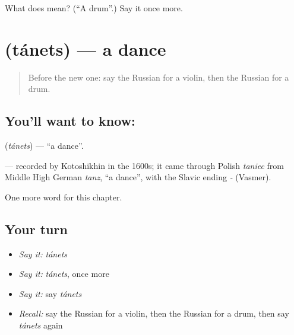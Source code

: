 \begin{tcolorbox}[breakable,colback=teal!4,colframe=teal!35!black,title={Before you move on}]
What does  mean? (\textquotedblleft{}A drum\textquotedblright{}.) Say it once more.
\end{tcolorbox}
\section[\texorpdfstring{\ru{танец} (tánets)}{танец (tánets)}]{ (tánets) — a dance}

\label{lesson:RU-C226-tanets}



\begin{quote}
Before the new one: say the Russian for a violin, then the Russian for a drum.
\end{quote}

\subsection*{You'll want to know: }
\textbf{} (\emph{tánets}) — \textquotedblleft{}a dance\textquotedblright{}.

\begin{cousinweb}
\textbf{} — recorded by Kotoshikhin in the 1600s; it came through Polish \emph{taniec} from Middle High German \emph{tanz}, \textquotedblleft{}a dance\textquotedblright{}, with the Slavic ending \emph{-} (Vasmer).
\end{cousinweb}

\begin{grammarlens}[title={What you've built}]
One more word for this chapter.
\end{grammarlens}

\subsection*{Your turn}
\begin{itemize}
\raggedright
  \item \emph{Say it:} \emph{tánets}
  \item \emph{Say it:} \emph{tánets}, once more
  \item \emph{Say it:} say \emph{tánets}
  \item \emph{Recall:} say the Russian for a violin, then the Russian for a drum, then say \emph{tánets} again
\end{itemize}

